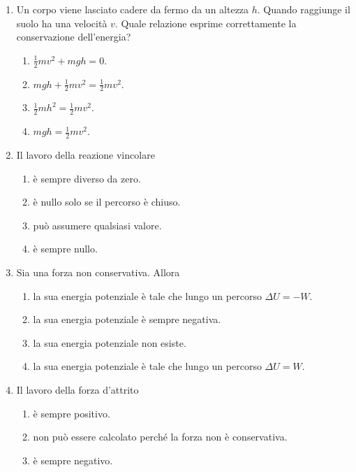 \documentclass{article}
\begin{document}
\begin{enumerate}
\begin{enumerate}[label=\Alph*.]
    \item $\frac{v^2}{2g\mu}}$.
    \item $\frac{1}{2}v^2-\mu g$.
    \item $\frac{1}{2}v^2+\mu g$.
    \item $\frac{2v^2}{g\mu}}$.
  \end{enumerate}
  \item Un corpo viene lasciato cadere da fermo da un altezza $h$. Quando raggiunge il suolo ha una velocità $v$. Quale relazione esprime correttamente la conservazione dell'energia?
  \begin{enumerate}[label=\Alph*.]
    \item $\frac{1}{2}mv^2+mgh=0.$
    \item $mgh+\frac{1}{2}mv^2=\frac{1}{2}mv^2.$
    \item $\frac{1}{2}mh^2=\frac{1}{2}mv^2$.
    \item $mgh=\frac{1}{2}mv^2$.
  \end{enumerate}
  \item Il lavoro della reazione vincolare
  \begin{enumerate}[label=\Alph*.]
    \item è sempre diverso da zero.
    \item è nullo solo se il percorso è chiuso.
    \item può assumere qualsiasi valore.
    \item è sempre nullo.
  \end{enumerate}
  \item Sia  una forza non conservativa. Allora
  \begin{enumerate}[label=\Alph*.]
    \item la sua energia potenziale è tale che lungo un percorso $\Delta U=-W$.
    \item la sua energia potenziale è sempre negativa.
    \item la sua energia potenziale non esiste.
    \item la sua energia potenziale è tale che lungo un percorso $\Delta U=W$.
  \end{enumerate}
  \item Il lavoro della forza d'attrito
  \begin{enumerate}[label=\Alph*.]
    \item è sempre positivo.
    \item non può essere calcolato perché la forza non è conservativa.
    \item è sempre negativo.

\end{enumerate}
\end{enumerate}
\end{document}
